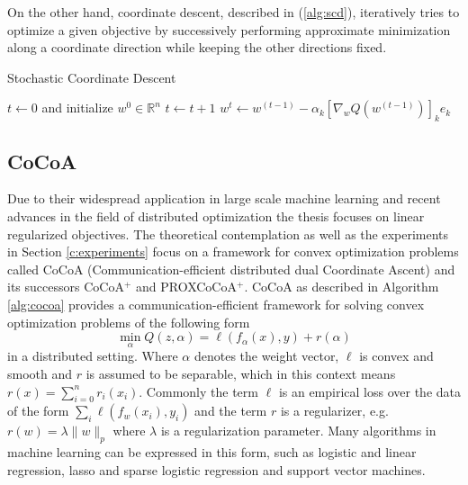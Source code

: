 On the other hand, coordinate descent, described in (\ref{alg:scd}), iteratively tries to optimize a given objective by successively performing approximate minimization along a coordinate direction while keeping the other directions fixed.
\begin{algorithm}
\caption{Stochastic Coordinate Descent}\label{alg:scd}
\begin{algorithmic}[1]
\State $t\gets 0$ and initialize $w^0 \in \mathbb{R}^n$
\Repeat
\State $t \gets t + 1$
\State $w^{t} \gets w^{(t-1)} - \alpha_k[\nabla_wQ(w^{(t-1)})]_ke_k$
\EndFor
{}
\end{algorithmic}
\end{algorithm}

\subsection{CoCoA}
Due to their widespread application in large scale machine learning and recent advances in the field of distributed optimization the thesis focuses on linear regularized objectives.
The theoretical contemplation as well as the experiments in Section \ref{c:experiments} focus on a framework for convex optimization problems called CoCoA (Communication-efficient distributed dual Coordinate Ascent) \cite{Jaggi2014} and its successors CoCoA$^+$\cite{smith2015l1} and PROXCoCoA$^+$\cite{smith2016cocoa}.
CoCoA as described in Algorithm \ref{alg:cocoa} provides a communication-efficient framework for solving convex optimization problems of the following form
\begin{equation}
\min_{\alpha} Q(z,\alpha) = \ell(f_\alpha(x),y) + r(\alpha)
\label{eqn:lin_loss}
\end{equation}
in a distributed setting.
Where $\alpha$ denotes the weight vector, $\ell$ is convex and smooth and $r$ is assumed to be separable, which in this context means $r(x) = \sum_{i=0}^nr_i(x_i)$.
Commonly the term $\ell$ is an empirical loss over the data of the form $\sum_{i} \ell(f_w(x_i), y_i)$ and the term $r$ is a regularizer, e.g. $r(w) = \lambda\|w\|_p$ where $\lambda$ is a regularization parameter.
Many algorithms in machine learning can be expressed in this form, such as logistic and linear regression, lasso and sparse logistic regression and support vector machines.

